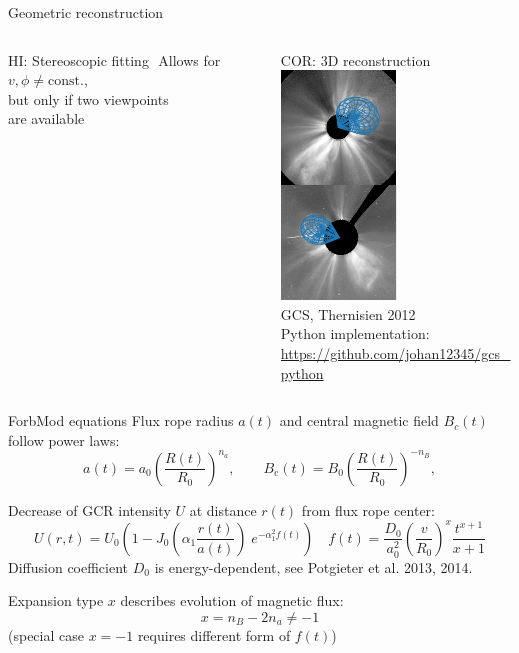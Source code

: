 \documentclass[10pt,aspectratio=169,usenames,dvipsnames]{beamer}
\newcommand{\textarrowfootnotesize}{\,{\scriptsize\faLongArrowAltRight}\,}
\begin{document}
\begin{frame}{Geometric reconstruction}
\begin{columns}[t]
\begin{column}{0.32\textwidth}
\begin{block}{HI: Stereoscopic fitting}
                {\footnotesize \textarrowfootnotesize Allows for $v, \phi \neq \text{const.}$,\\ but only if two viewpoints\\[-1.25mm] are available}
                \vskip4mm
            \end{block}
        \end{column}
        \begin{column}{0.32\textwidth}
            \begin{block}{COR: 3D reconstruction}
                \centering
                \includegraphics[height=0.65\textheight]{plots/gcs.pdf}\\[-1.5mm]
                {\footnotesize GCS, Thernisien 2012}\\
                {\scriptsize Python implementation:\\[-2mm] \tiny\url{https://github.com/johan12345/gcs_python}}
            \end{block} 
            
        \end{column}
    \end{columns}
\end{frame}

\begin{frame}{ForbMod equations}
Flux rope radius $a(t)$ and central magnetic field $B_c(t)$ follow power laws:
\[
a(t) = a_0 \left(\frac{R(t)}{R_0}\right)^{n_a}, \qquad B_\text{c}(t) = B_0 \left(\frac{R(t)}{R_0}\right)^{-n_B},
\]

Decrease of GCR intensity $U$ at distance $r(t)$ from flux rope center:
\[
U(r, t) = U_0 \left(1 - J_0\mathopen{}\left(\alpha_1 \frac{r(t)}{a(t)}\right)\mathclose{} \; e^{-\alpha_1^2 f(t)} \right)
\quad
f(t) = \frac{D_0}{a_0^2} \left(\frac{v}{R_0}\right)^x \frac{t^{x+1}}{x+1}
\]
Diffusion coefficient $D_0$ is energy-dependent, see Potgieter et al. 2013, 2014.

Expansion type $x$ describes evolution of magnetic flux:
\[
x = n_B - 2n_a \neq -1
\]
(special case $x = -1$ requires different form of $f(t)$)
\end{frame}
\end{document}
